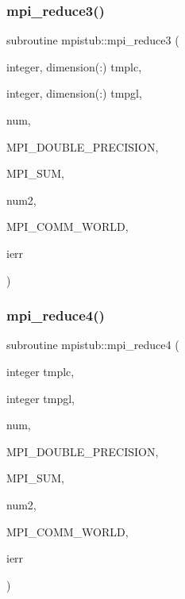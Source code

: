 \subsubsection{\texorpdfstring{mpi\_reduce3()}{mpi\_reduce3()}}
{\footnotesize\ttfamily subroutine mpistub\+::mpi\+\_\+reduce3 (\begin{DoxyParamCaption}\item[{integer, dimension(\+:)}]{tmplc,  }\item[{integer, dimension(\+:)}]{tmpgl,  }\item[{}]{num,  }\item[{}]{M\+P\+I\+\_\+\+D\+O\+U\+B\+L\+E\+\_\+\+P\+R\+E\+C\+I\+S\+I\+ON,  }\item[{}]{M\+P\+I\+\_\+\+S\+UM,  }\item[{}]{num2,  }\item[{}]{M\+P\+I\+\_\+\+C\+O\+M\+M\+\_\+\+W\+O\+R\+LD,  }\item[{}]{ierr }\end{DoxyParamCaption})}

\mbox{\label{namespacempistub_ad1156be68f1c3c3dd3d844d6d4cee160}} 
\subsubsection{\texorpdfstring{mpi\_reduce4()}{mpi\_reduce4()}}
{\footnotesize\ttfamily subroutine mpistub\+::mpi\+\_\+reduce4 (\begin{DoxyParamCaption}\item[{integer}]{tmplc,  }\item[{integer}]{tmpgl,  }\item[{}]{num,  }\item[{}]{M\+P\+I\+\_\+\+D\+O\+U\+B\+L\+E\+\_\+\+P\+R\+E\+C\+I\+S\+I\+ON,  }\item[{}]{M\+P\+I\+\_\+\+S\+UM,  }\item[{}]{num2,  }\item[{}]{M\+P\+I\+\_\+\+C\+O\+M\+M\+\_\+\+W\+O\+R\+LD,  }\item[{}]{ierr }\end{DoxyParamCaption})}

\mbox{\label{namespacempistub_aa276a91b8fd09a5bf247b20692731dd8}} 
